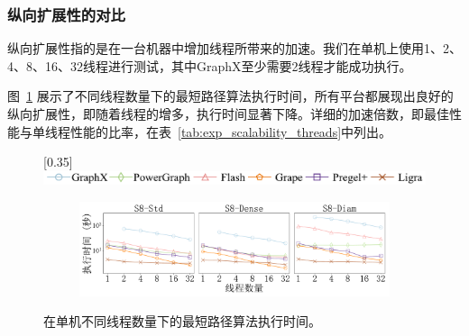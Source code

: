\subsubsection{纵向扩展性的对比}

纵向扩展性指的是在一台机器中增加线程所带来的加速。我们在单机上使用1、2、4、8、16、32线程进行测试，其中GraphX至少需要2线程才能成功执行。

图~\ref{fig:exp_scalability_threads} 展示了不同线程数量下的最短路径算法执行时间，所有平台都展现出良好的纵向扩展性，即随着线程的增多，执行时间显著下降。详细的加速倍数，即最佳性能与单线程性能的比率，在表~\ref{tab:exp_scalability_threads}中列出。

\begin{table}[h]\centering
    \def\arraystretch{1.5}
    \caption{纵向扩展性加速倍数}
    \label{tab:exp_scalability_threads}
    \tiny
\end{table}

\begin{figure}[h]\centering

	\scalebox{0.35}[0.35]{\includegraphics{figures/vertical_scalability_legend.pdf}}

	\begin{subfigure}[b]{0.8\textwidth}
        \includegraphics[width=\textwidth]{figures/sssp_vertical_scalability_zh.pdf}
    \end{subfigure}
	
	\caption{在单机不同线程数量下的最短路径算法执行时间。}
	\label{fig:exp_scalability_threads}
\end{figure}

